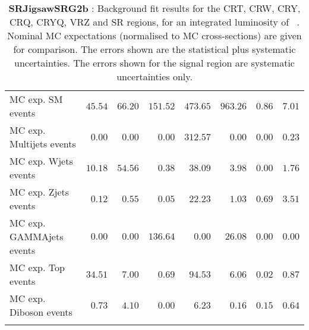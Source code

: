 \begin{table}
\begin{center}
{\begin{tabular*}{\textwidth}{@{\extracolsep{\fill}}lrrrrrrr}
 \noalign{\smallskip}\hline\noalign{\smallskip}
MC exp. SM events              & $45.54$          & $66.20$          & $151.52$          & $473.65$          & $963.26$          & $0.86$          & $7.01$              \\
\noalign{\smallskip}\hline\noalign{\smallskip}
        MC exp. Multijets events         & $0.00$          & $0.00$          & $0.00$          & $312.57$          & $0.00$          & $0.00$          & $0.23$              \\
        MC exp. Wjets events         & $10.18$          & $54.56$          & $0.38$          & $38.09$          & $3.98$          & $0.00$          & $1.76$              \\
        MC exp. Zjets events         & $0.12$          & $0.55$          & $0.05$          & $22.23$          & $1.03$          & $0.69$          & $3.51$              \\
        MC exp. GAMMAjets events         & $0.00$          & $0.00$          & $136.64$          & $0.00$          & $26.08$          & $0.00$          & $0.00$              \\
        MC exp. Top events         & $34.51$          & $7.00$          & $0.69$          & $94.53$          & $6.06$          & $0.02$          & $0.87$              \\
        MC exp. Diboson events         & $0.73$          & $4.10$          & $0.00$          & $6.23$          & $0.16$          & $0.15$          & $0.64$              \\
\noalign{\smallskip}\hline\noalign{\smallskip}
\end{tabular*}
}
\end{center}
\caption{{\bf SRJigsawSRG2b} : Background fit results for the CRT, CRW, CRY, CRQ, CRYQ, VRZ and SR regions, for an integrated luminosity of \ourintlumi~\ifb. Nominal MC expectations (normalised to MC cross-sections) are given for comparison. The errors shown are the statistical plus systematic uncertainties. The errors shown for the signal region are systematic uncertainties only.}
\label{table.results.systematics.in.logL.fit.CRT.CRW.CRY.CRQ.CRYQ.VRZ.SR.SRJigsawSRG2b}
\end{table}
%